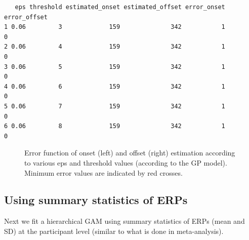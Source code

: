 \documentclass[
  doc,
  floatsintext,
  longtable,
  a4paper,
  nolmodern,
  notxfonts,
  notimes,
  colorlinks=true,linkcolor=blue,citecolor=blue,urlcolor=blue]{apa7}
\begin{document}
\begin{verbatim}
   eps threshold estimated_onset estimated_offset error_onset error_offset
1 0.06         3             159              342           1            0
2 0.06         4             159              342           1            0
3 0.06         5             159              342           1            0
4 0.06         6             159              342           1            0
5 0.06         7             159              342           1            0
6 0.06         8             159              342           1            0
\end{verbatim}

\begin{figure}[!htb]

\caption{\label{fig-onset-error}Error function of onset (left) and
offset (right) estimation according to various eps and threshold values
(according to the GP model). Minimum error values are indicated by red
crosses.}


\end{figure}%

\newpage

\subsection{Using summary statistics of
ERPs}\label{using-summary-statistics-of-erps}

Next we fit a hierarchical GAM using summary statistics of ERPs (mean
and SD) at the participant level (similar to what is done in
meta-analysis).
\end{document}
